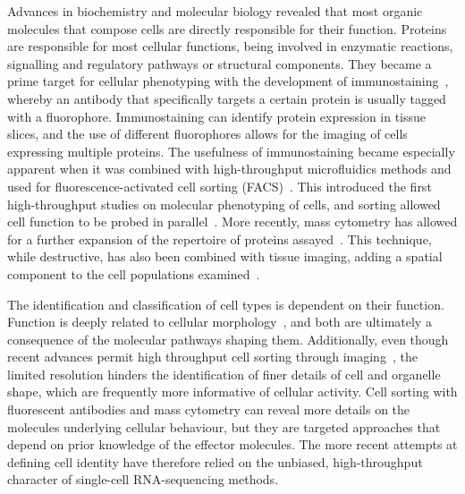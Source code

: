 Advances in biochemistry and molecular biology revealed that most organic molecules that compose cells are directly responsible for their function. Proteins are responsible for most cellular functions, being involved in enzymatic reactions, signalling and regulatory pathways or structural components. They became a prime target for cellular phenotyping with the development of immunostaining~\citep{coons_immunological_1941}, whereby an antibody that specifically targets a certain protein is usually tagged with a fluorophore. Immunostaining can identify protein expression in tissue slices, and the use of different fluorophores allows for the imaging of cells expressing multiple proteins. The usefulness of immunostaining became especially apparent when it was combined with high-throughput microfluidics methods and used for fluorescence-activated cell sorting (FACS)~\citep{bonner_fluorescence_1972}. This introduced the first high-throughput studies on molecular phenotyping of cells, and sorting allowed cell function to be probed in parallel~\citep{julius_demonstration_1972}. More recently, mass cytometry has allowed for a further expansion of the repertoire of proteins assayed~\citep{bandura_mass_2009,di_palma_unraveling_2015}. This technique, while destructive, has also been combined with tissue imaging, adding a spatial component to the cell populations examined~\citep{chang_imaging_2017}.

The identification and classification of cell types is dependent on their function. Function is deeply related to cellular morphology~\citep{prasad_cell_2019}, and both are ultimately a consequence of the molecular pathways shaping them. Additionally, even though recent advances permit high throughput cell sorting through imaging~\citep{nitta_intelligent_2018}, the limited resolution hinders the identification of finer details of cell and organelle shape, which are frequently more informative of cellular activity. Cell sorting with fluorescent antibodies and mass cytometry can reveal more details on the molecules underlying cellular behaviour, but they are targeted approaches that depend on prior knowledge of the effector molecules. The more recent attempts at defining cell identity have therefore relied on the unbiased, high-throughput character of single-cell RNA-sequencing methods.



